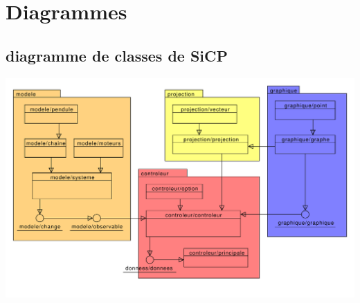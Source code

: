 %
\section{Diagrammes}
%
%
\subsection{diagramme de classes de SiCP}
%
\begin{center}
\includegraphics[scale=0.51]{./illustration/classesSiCP}
\end{center}
%



